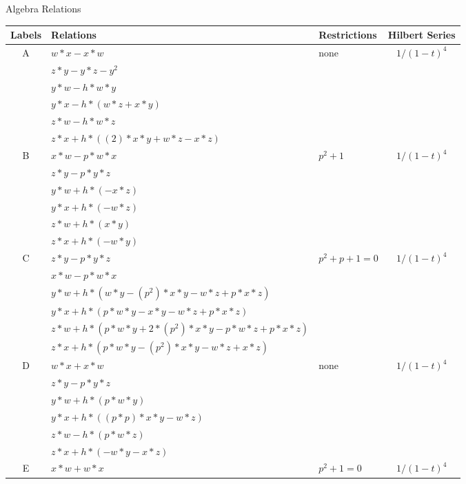 \documentclass[12]{article}
\begin{document}
\pagebreak


\begin{center}
Algebra Relations
\end{center}
\begin{longtable}[c]{|c|p{5.75cm}|p{2.75cm}|c|}
\toprule
 Labels & Relations & Restrictions & Hilbert Series \\ 
\endfirsthead 
  \hline
   A & $ w*x - x*w $ &\multirow{6}{*}{none} &\multirow{6}{*}{$ 1/(1-t)^4 $} \\ 
    & $ z*y - y*z - y^2 $ & &  \\ 
   & $ y*w - h*w*y	$ & & \\  
   & $ y*x - h*(w*z + x*y) $ & & \\  
   & $ z*w - h*w*z $ & & \\ 
   & $ z*x + h*((2)*x*y + w*z - x*z) $ & &  \\  
\hline
 B & $ x*w - p*w*x $ &\multirow{6}{*}{$ p^2+1 $} &\multirow{6}{*}{$ 1/(1-t)^4 $} \\ 
    & $ z*y - p*y*z $ & &  \\ 
   & $ y*w + h*(-x*z) $ & & \\  
   & $ y*x + h*(-w*z) $ & & \\  
   & $  z*w + h*(x*y) $ & & \\ 
   & $ z*x + h*(-w*y) $ & &  \\  
\hline
 C & $  z*y - p*y*z $ &\multirow{6}{*}{$ p^2 + p + 1 = 0 $} &\multirow{6}{*}{$ 1/(1-t)^4 $} \\ 
    & $  x*w - p*w*x $ & &  \\ 
   & $ y*w + h*(w*y - (p^2)*x*y - w*z + p*x*z) $ & & \\  
   & $ y*x + h*(p*w*y - x*y - w*z + p*x*z) $ & & \\  
   & $  z*w + h*(p*w*y + 2*(p^2)*x*y - p*w*z + p*x*z) $ & & \\ 
   & $  z*x + h*(p*w*y - (p^2)*x*y - w*z + x*z) $ & &  \\  
\hline
 D & $ w*x + x*w $ &\multirow{6}{*}{none} &\multirow{6}{*}{$ 1/(1-t)^4 $} \\ 
    & $ z*y - p*y*z $ & &  \\ 
   & $ y*w + h*(p*w*y) $ & & \\  
   & $ y*x + h*((p*p)*x*y - w*z) $ & & \\  
   & $ z*w - h*(p*w*z) $ & & \\ 
   & $ z*x + h*(-w*y - x*z) $ & &  \\  
\hline
 E & $ x*w + w*x $ &\multirow{6}{*}{$ p^2+1=0 $} &\multirow{6}{*}{$ 1/(1-t)^4 $} \\ 

\end{longtable}
\end{document}
